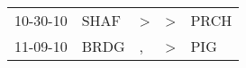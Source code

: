 \begin{supertabular}{p{0.07\textwidth}p{0.06\textwidth}p{0.02\textwidth}p{0.02\textwidth}p{0.06\textwidth}}
 10-30-10\textsuperscript{} &  SHAF\textsuperscript{} &  \textgreater &  \textgreater &  PRCH\textsuperscript{} \\
 11-09-10\textsuperscript{} &  BRDG\textsuperscript{} &             , &  \textgreater &   PIG\textsuperscript{} \\
\end{supertabular}
